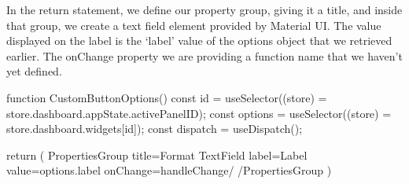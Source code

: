 \documentclass[letterpaper,10pt,english]{sphinxmanual}
\begin{document}
%
\begin{sphinxVerbatim}[commandchars=\\\{\},numbers=left,firstnumber=1,stepnumber=1]
\PYG{p}{[}\PYG{p}{]}


\end{sphinxVerbatim}
\sphinxresetverbatimhllines

\sphinxAtStartPar
In the return statement, we define our property group, giving it a title, and inside that group, we create a text field element provided by Material UI. The value displayed on the label is the ‘label’ value of the options object that we retrieved earlier. The onChange property we are providing a function name  that we haven’t yet defined.

%
\begin{sphinxVerbatim}[commandchars=\\\{\},numbers=left,firstnumber=1,stepnumber=1]
function CustomButtonOptions() \PYGZob{}
   const id = useSelector((store) =\PYGZgt{} store.dashboard.appState.activePanelID);
   const options = useSelector((store) =\PYGZgt{} store.dashboard.widgets[id]);
   const dispatch = useDispatch();

   return (
      \PYGZlt{}PropertiesGroup title=\PYGZdq{}Format\PYGZdq{}\PYGZgt{}
         \PYGZlt{}TextField label=\PYGZdq{}Label\PYGZdq{} value=\PYGZob{}options.label\PYGZcb{} onChange=\PYGZob{}handleChange\PYGZcb{}/\PYGZgt{}
      \PYGZlt{}/PropertiesGroup\PYGZgt{}
   )
\PYGZcb{}
\end{sphinxVerbatim}
\sphinxresetverbatimhllines
\end{document}

